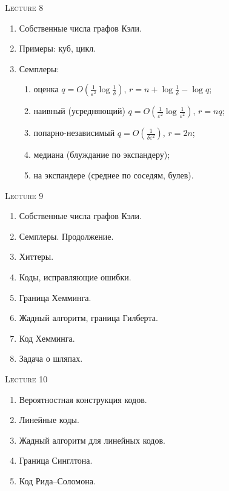 \centerline{\textsc{Lecture 8}}

\begin{enumerate}
    \item Собственные числа графов Кэли.
    \item Примеры: куб, цикл.
    \item Семплеры:
        \begin{enumerate}
            \item оценка $q = O\left(\frac{1}{ \varepsilon^2}\log \frac{1}{\delta}\right)$, $r = n +
                \log \frac{1}{\delta} - \log q$;
            \item наивный (усредняющий) $q = O\left( \frac{1}{\varepsilon^2}
                \log\frac{1}{\varepsilon^2}\right)$, $r = n q$;
            \item попарно-независимый $q = O\left( \frac{1}{\delta \varepsilon^2}\right)$, $r = 2n$;
            \item медиана (блуждание по экспандеру);
            \item на экспандере (среднее по соседям, булев).
        \end{enumerate}
\end{enumerate}

\centerline{\textsc{Lecture 9}}

\begin{enumerate}
    \item Собственные числа графов Кэли.
    \item Семплеры. Продолжение.
    \item Хиттеры.
    \item Коды, исправляющие ошибки.
    \item Граница Хемминга.
    \item Жадный алгоритм, граница Гилберта.
    \item Код Хемминга.
    \item Задача о шляпах.
\end{enumerate}


\centerline{\textsc{Lecture 10}}

\begin{enumerate}
    \item Вероятностная конструкция кодов.
    \item Линейные коды.
    \item Жадный алгоритм для линейных кодов.
    \item Граница Синглтона.
    \item Код Рида--Соломона.
\end{enumerate}

